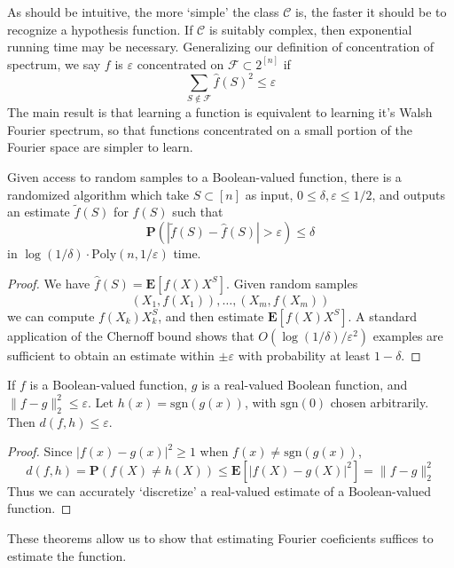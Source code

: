 As should be intuitive, the more `simple' the class $\mathcal{C}$ is, the faster it should be to recognize a hypothesis function. If $\mathcal{C}$ is suitably complex, then exponential running time may be necessary. Generalizing our definition of concentration of spectrum, we say $f$ is $\varepsilon$ concentrated on $\mathcal{F} \subset 2^{[n]}$ if 
%
\[ \sum_{S \not \in \mathcal{F}} \widehat{f}(S)^2 \leq \varepsilon \]
%
The main result is that learning a function is equivalent to learning it's Walsh Fourier spectrum, so that functions concentrated on a small portion of the Fourier space are simpler to learn.

\begin{theorem}
    Given access to random samples to a Boolean-valued function, there is a randomized algorithm which take $S \subset [n]$ as input, $0 \leq \delta, \varepsilon \leq 1/2$, and outputs an estimate $\widetilde{f}(S)$ for $\widehat{f}(S)$ such that
    \[ \mathbf{P}(|\widetilde{f}(S) - \widehat{f}(S)| > \varepsilon) \leq \delta \]
    in $\log(1/\delta) \cdot \text{Poly}(n, 1/\varepsilon)$ time.
\end{theorem}
\begin{proof}
    We have $\widehat{f}(S) = \mathbf{E}[f(X) X^S]$. Given random samples
    \[ (X_1, f(X_1)), \dots, (X_m, f(X_m)) \]
    we can compute $f(X_k)X_k^S$, and then estimate $\mathbf{E}[f(X) X^S]$. A standard application of the Chernoff bound shows that $O(\log(1/\delta)/\varepsilon^2)$ examples are sufficient to obtain an estimate within $\pm \varepsilon$ with probability at least $1 - \delta$.
\end{proof}

\begin{theorem}
    If $f$ is a Boolean-valued function, $g$ is a real-valued Boolean function, and $\| f - g \|_2^2 \leq \varepsilon$. Let $h(x) = \text{sgn}(g(x))$, with $\text{sgn}(0)$ chosen arbitrarily. Then $d(f,h) \leq \varepsilon$.
\end{theorem}
\begin{proof}
    Since $|f(x) - g(x)|^2 \geq 1$ when $f(x) \neq \text{sgn}(g(x))$,
    \[ d(f,h) = \mathbf{P}(f(X) \neq h(X)) \leq \mathbf{E}[|f(X) - g(X)|^2] = \| f - g \|_2^2 \]
    Thus we can accurately `discretize' a real-valued estimate of a Boolean-valued function.
\end{proof}

These theorems allow us to show that estimating Fourier coeficients suffices to estimate the function.

